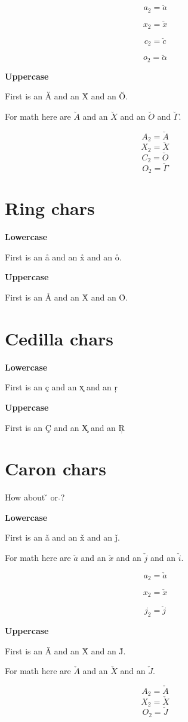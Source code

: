\documentclass{article}
\begin{document}
$$a_2=\breve{a}$$

$$x_2=\breve{x}$$

$$c_2=\breve{c}$$

$$o_2=\breve{\alpha}$$

\textbf{Uppercase}

First is an \u{A} and an \u{X} and an \u{O}.

For math here are $\breve{A}$ and an $\breve{X}$ and an $\breve{O}$ and $\breve{\Gamma}$.

$$A_2=\breve{A}$$
$$X_2=\breve{X}$$
$$C_2=\breve{O}$$
$$O_2=\breve{\Gamma}$$

\section{Ring chars}
\textbf{Lowercase}

First is an \r{a} and an \r{x} and an \r{o}.

\textbf{Uppercase}

First is an \r{A} and an \r{X} and an \r{O}.




\section{Cedilla chars}
\textbf{Lowercase}

First is an \c{c} and an \c{x} and an \c{r}

\textbf{Uppercase}

First is an \c{C} and an \c{X} and an \c{R}




\section{Caron chars}

How about \v{} or $\check{}$? 

\textbf{Lowercase}

First is an \v{a} and an \v{x} and an \v{j}.

For math here are $\check{a}$ and an $\check{x}$ and an $\check{j}$  and an $\check{i}$.

$$a_2=\check{a}$$

$$x_2=\check{x}$$

$$j_2=\check{j}$$

\textbf{Uppercase}

First is an \v{A} and an \v{X} and an \v{J}.

For math here are $\check{A}$ and an $\check{X}$ and an $\check{J}$.

$$A_2=\check{A}$$
$$X_2=\check{X}$$
$$O_2=\check{J}$$
\end{document}
